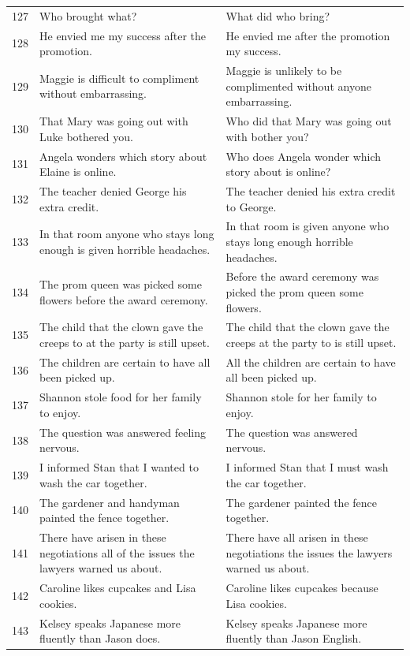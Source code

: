 \documentclass[doc]{apa6}
\begin{document}
\begin{small}
\begin{longtable}{p{1cm} | p{8.5cm} | p{8.5cm}}
127 & Who brought what? & What did who bring?\\
128 & He envied me my success after the promotion. & He envied me after the promotion my success.\\
129 & Maggie is difficult to compliment without embarrassing. & Maggie is unlikely to be complimented without anyone embarrassing.\\
130 & That Mary was going out with Luke bothered you. & Who did that Mary was going out with bother you?\\
131 & Angela wonders which story about Elaine is online. & Who does Angela wonder which story about is online?\\
132 & The teacher denied George his extra credit. & The teacher denied his extra credit to George.\\
133 & In that room anyone who stays long enough is given horrible headaches. & In that room is given anyone who stays long enough horrible headaches.\\
134 & The prom queen was picked some flowers before the award ceremony. & Before the award ceremony was picked the prom queen some flowers.\\
135 & The child that the clown gave the creeps to at the party is still upset. & The child that the clown gave the creeps at the party to is still upset.\\
136 & The children are certain to have all been picked up. & All the children are certain to have all been picked up.\\
137 & Shannon stole food for her family to enjoy. & Shannon stole for her family to enjoy.\\
138 & The question was answered feeling nervous. & The question was answered nervous.\\
139 & I informed Stan that I wanted to wash the car together. & I informed Stan that I must wash the car together.\\
140 & The gardener and handyman painted the fence together. & The gardener painted the fence together.\\
141 & There have arisen in these negotiations all of the issues the lawyers warned us about. & There have all arisen in these negotiations the issues the lawyers warned us about.\\
142 & Caroline likes cupcakes and Lisa cookies. & Caroline likes cupcakes because Lisa cookies.\\
143 & Kelsey speaks Japanese more fluently than Jason does. & Kelsey speaks Japanese more fluently than Jason English.\\

\end{longtable}
\end{small}
\end{document}
